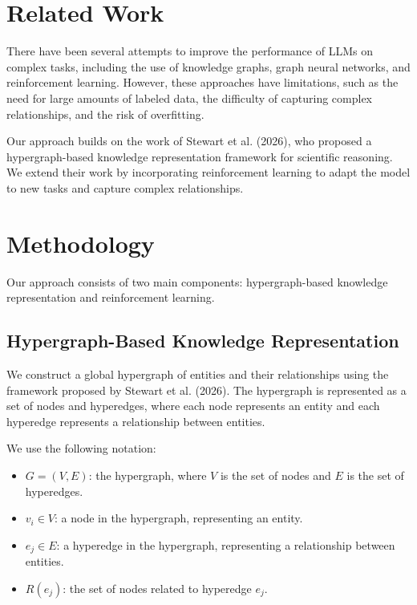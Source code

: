\documentclass[11pt]{article}
\begin{document}
        \section{Related Work}

        There have been several attempts to improve the performance of LLMs on complex tasks, including the use of knowledge graphs, graph neural networks, and reinforcement learning. However, these approaches have limitations, such as the need for large amounts of labeled data, the difficulty of capturing complex relationships, and the risk of overfitting.

        Our approach builds on the work of Stewart et al. (2026), who proposed a hypergraph-based knowledge representation framework for scientific reasoning. We extend their work by incorporating reinforcement learning to adapt the model to new tasks and capture complex relationships.

        \section{Methodology}

        Our approach consists of two main components: hypergraph-based knowledge representation and reinforcement learning.

        \subsection{Hypergraph-Based Knowledge Representation}

        We construct a global hypergraph of entities and their relationships using the framework proposed by Stewart et al. (2026). The hypergraph is represented as a set of nodes and hyperedges, where each node represents an entity and each hyperedge represents a relationship between entities.

        We use the following notation:

        \begin{itemize}

        \item $G = (V, E)$: the hypergraph, where $V$ is the set of nodes and $E$ is the set of hyperedges.

        \item $v_i \in V$: a node in the hypergraph, representing an entity.

        \item $e_j \in E$: a hyperedge in the hypergraph, representing a relationship between entities.

        \item $R(e_j)$: the set of nodes related to hyperedge $e_j$.

        \end{itemize}
\end{document}
